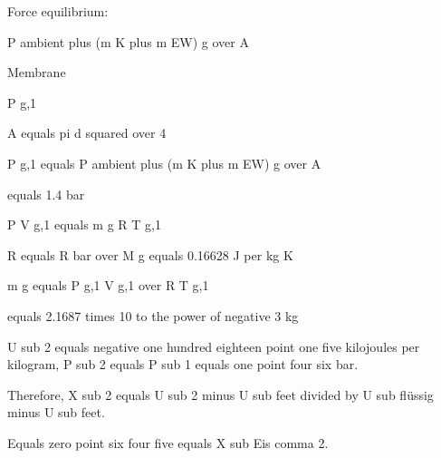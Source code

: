 Force equilibrium:

P ambient plus (m K plus m EW) g over A

Membrane

P g,1

A equals pi d squared over 4

P g,1 equals P ambient plus (m K plus m EW) g over A

equals 1.4 bar

P V g,1 equals m g R T g,1

R equals R bar over M g equals 0.16628 J per kg K

m g equals P g,1 V g,1 over R T g,1

equals 2.1687 times 10 to the power of negative 3 kg

U sub 2 equals negative one hundred eighteen point one five kilojoules per kilogram, P sub 2 equals P sub 1 equals one point four six bar.

Therefore, X sub 2 equals U sub 2 minus U sub feet divided by U sub flüssig minus U sub feet.

Equals zero point six four five equals X sub Eis comma 2.